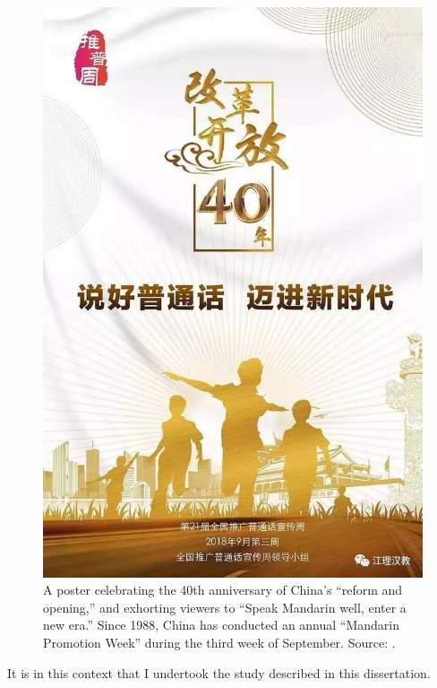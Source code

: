         \begin{figure}
            \centering
            \includegraphics[scale=0.5]{figs/speakpth.jpeg}
            \caption{A poster celebrating the 40th anniversary of China's ``reform and opening,'' and exhorting viewers to ``Speak Mandarin well, enter a new era.'' Since 1988, China has conducted an annual ``Mandarin Promotion Week'' during the third week of September. Source: \cite{speakPTH!}.}
            \label{fig:speakpth!}
        \end{figure}
    It is in this context that I undertook the study described in this dissertation.
    
